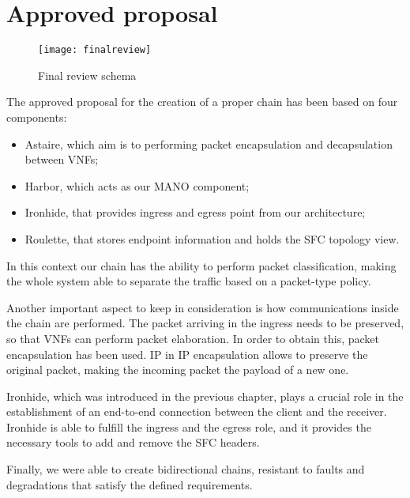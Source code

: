 \section{Approved proposal}

\begin{figure}[t]
  \centering
  \texttt{[image: finalreview]}
  \caption{Final review schema}
  \label{chap:impl:img:finalreview}
\end{figure}

The approved proposal for the creation of a proper chain has been based on four components:
\begin{itemize}
\item Astaire, which aim is to performing packet encapsulation and decapsulation
  between VNFs;
\item Harbor, which acts as our MANO component;
\item Ironhide, that provides ingress and egress point from our architecture;
\item Roulette, that stores endpoint information and holds the SFC topology
  view.
\end{itemize}

In this context our chain has the ability to perform packet classification,
making the whole system able to separate the traffic based on a packet-type
policy. 

Another important aspect to keep in consideration is how communications inside
the chain are performed. The packet arriving in the ingress needs to be
preserved, so that VNFs can perform packet elaboration. In order to obtain this,
packet encapsulation has been used. IP in IP encapsulation allows to preserve
the original packet, making the incoming packet the payload of a new one.

Ironhide, which was introduced in the previous chapter, plays a crucial role in
the establishment of an end-to-end connection between the client and the
receiver. Ironhide is able to fulfill the ingress and the egress role, and it
provides the necessary tools to add and remove the SFC headers.

Finally, we were able to create bidirectional chains, resistant to faults and
degradations that satisfy the defined requirements.
